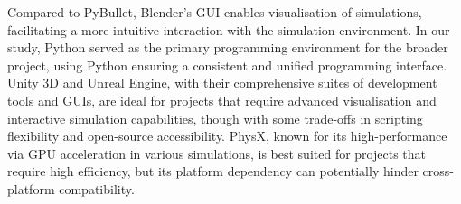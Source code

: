 \documentclass[preprint,12pt]{elsarticle}
\begin{document}
\par
Compared to PyBullet, Blender's GUI enables visualisation of simulations, facilitating a more intuitive interaction with the simulation environment.
In our study, Python served as the primary programming environment for the broader project, using Python ensuring a consistent and unified programming interface.
Unity 3D and Unreal Engine, with their comprehensive suites of development tools and GUIs, are ideal for projects that require advanced visualisation and interactive simulation capabilities, though with some trade-offs in scripting flexibility and open-source accessibility. 
PhysX, known for its high-performance via GPU acceleration in various simulations, is best suited for projects that require high efficiency, but its platform dependency can potentially hinder cross-platform compatibility. 
\end{document}
